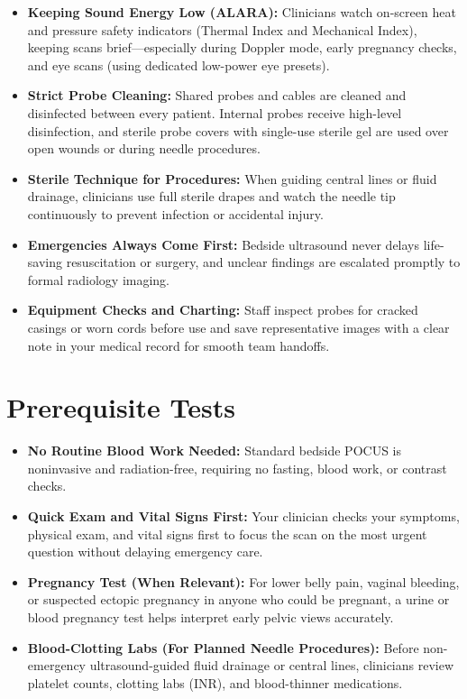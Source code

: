 \begin{itemize}
    \item \textbf{Keeping Sound Energy Low (ALARA):} Clinicians watch on-screen heat and pressure safety indicators (Thermal Index and Mechanical Index), keeping scans brief---especially during Doppler mode, early pregnancy checks, and eye scans (using dedicated low-power eye presets).
    \item \textbf{Strict Probe Cleaning:} Shared probes and cables are cleaned and disinfected between every patient. Internal probes receive high-level disinfection, and sterile probe covers with single-use sterile gel are used over open wounds or during needle procedures.
    \item \textbf{Sterile Technique for Procedures:} When guiding central lines or fluid drainage, clinicians use full sterile drapes and watch the needle tip continuously to prevent infection or accidental injury.
    \item \textbf{Emergencies Always Come First:} Bedside ultrasound never delays life-saving resuscitation or surgery, and unclear findings are escalated promptly to formal radiology imaging.
    \item \textbf{Equipment Checks and Charting:} Staff inspect probes for cracked casings or worn cords before use and save representative images with a clear note in your medical record for smooth team handoffs.
\end{itemize}

\section{Prerequisite Tests}

\begin{itemize}
    \item \textbf{No Routine Blood Work Needed:} Standard bedside POCUS is noninvasive and radiation-free, requiring no fasting, blood work, or contrast checks.
    \item \textbf{Quick Exam and Vital Signs First:} Your clinician checks your symptoms, physical exam, and vital signs first to focus the scan on the most urgent question without delaying emergency care.
    \item \textbf{Pregnancy Test (When Relevant):} For lower belly pain, vaginal bleeding, or suspected ectopic pregnancy in anyone who could be pregnant, a urine or blood pregnancy test helps interpret early pelvic views accurately.
    \item \textbf{Blood-Clotting Labs (For Planned Needle Procedures):} Before non-emergency ultrasound-guided fluid drainage or central lines, clinicians review platelet counts, clotting labs (INR), and blood-thinner medications.
\end{itemize}

